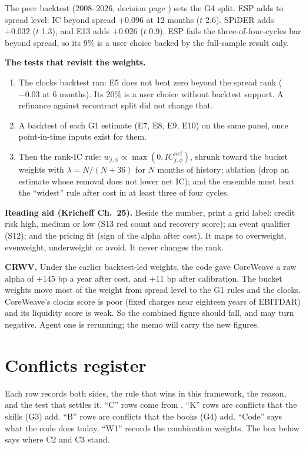 \documentclass[11pt]{article}
\begin{document}
The peer backtest (2008--2026, decision page ) sets the G4 split. ESP adds to spread level: IC beyond spread $+0.096$ at 12 months ($t$ 2.6). SPiDER adds $+0.032$ ($t$ 1.3), and E13 adds $+0.026$ ($t$ 0.9). ESP fails the three-of-four-cycles bar beyond spread, so its 9\% is a user choice backed by the full-sample result only.

\textbf{The tests that revisit the weights.}
\begin{enumerate}
\item The clocks backtest ran: E5 does not beat zero beyond the spread rank ($-0.03$ at 6 months). Its 20\% is a user choice without backtest support. A refinance against recontract split did not change that.
\item A backtest of each G1 estimate (E7, E8, E9, E10) on the same panel, once point-in-time inputs exist for them.
\item Then the rank-IC rule: $w_{j,\phi} \propto \max(0, IC^{net}_{j,\phi})$, shrunk toward the bucket weights with $\lambda = N/(N+36)$ for $N$ months of history; ablation (drop an estimate whose removal does not lower net IC); and the ensemble must beat the ``widest'' rule after cost in at least three of four cycles.
\end{enumerate}

\textbf{Reading aid (Kricheff Ch.~25).} Beside the number, print a grid label: credit risk high, medium or low (S13 red count and recovery score); an event qualifier (S12); and the pricing fit (sign of the alpha after cost). It maps to overweight, evenweight, underweight or avoid. It never changes the rank.

\textbf{CRWV.} Under the earlier backtest-led weights, the code gave CoreWeave a raw alpha of +145 bp a year after cost, and +11 bp after calibration. The bucket weights move most of the weight from spread level to the G1 rules and the clocks. CoreWeave's clocks score is poor (fixed charges near eighteen years of EBITDAR) and its liquidity score is weak. So the combined figure should fall, and may turn negative. Agent one is rerunning; the memo will carry the new figures.
\newpage
\section{Conflicts register}\label{sec:conflicts}

Each row records both sides, the rule that wins in this framework, the reason, and the test that settles it. ``C'' rows come from . ``K'' rows are conflicts that the skills (G3) add. ``B'' rows are conflicts that the books (G4) add. ``Code'' says what the code does today. ``W1'' records the combination weights. The box below says where C2 and C3 stand.
\end{document}
